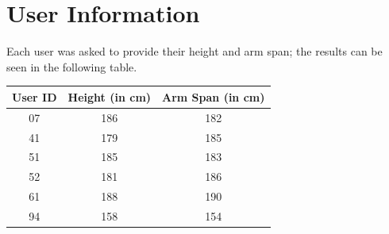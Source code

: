 \chapter{User Information}
\label{appendix: user information}

Each user was asked to provide their height and arm span; the results can be seen in the following table.

\begin{table}[!htb]
    \centering
    \begin{tabular}{c|c|c}
         User ID & Height (in cm) & Arm Span (in cm) \\
         \hline
         07 & 186 & 182 \\
         41 & 179 & 185 \\
         51 & 185 & 183 \\
         52 & 181 & 186 \\
         61 & 188 & 190 \\
         94 & 158 & 154 \\
    \end{tabular}
\end{table}